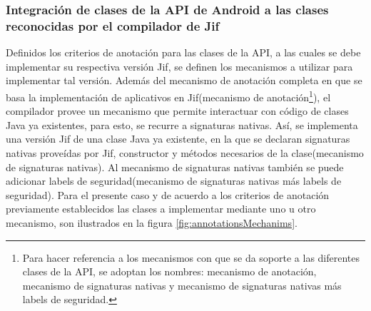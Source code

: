 % 
\subsubsection{Integración de clases de la API de Android a las clases
reconocidas por el compilador de Jif}
Definidos los criterios de anotación para las clases de la API, a las cuales se
debe implementar su respectiva versión Jif, se definen los mecanismos a utilizar
para implementar tal versión. Además del mecanismo de anotación completa en que
se basa la implementación de aplicativos en Jif(mecanismo de
anotación\footnote{Para hacer referencia a los mecanismos con que se da soporte
a las diferentes clases de la API, se adoptan los nombres: mecanismo de anotación,
mecanismo de signaturas nativas y mecanismo de signaturas nativas más labels
de seguridad.}), el compilador provee un mecanismo que permite interactuar con
código de clases Java ya existentes\cite{annotations-Jif}, para esto, se recurre
a signaturas nativas. Así, se implementa una versión Jif de una clase Java ya existente, en
la que se declaran signaturas nativas proveídas por Jif, constructor y métodos
necesarios de la clase(mecanismo de signaturas nativas).
Al mecanismo de signaturas nativas también se puede  adicionar labels de
seguridad(mecanismo de signaturas nativas más labels de seguridad).\newline
Para el presente caso y de acuerdo a los criterios de anotación previamente
establecidos las clases a implementar mediante uno u otro mecanismo, son
ilustrados en la figura \ref{fig:annotationsMechanims}.\newline

